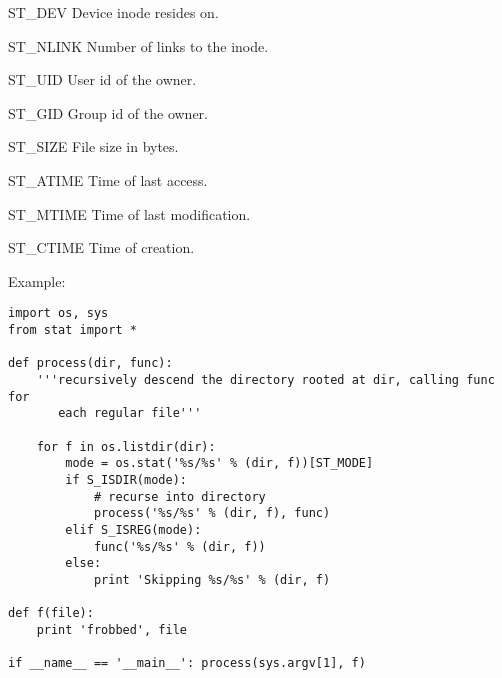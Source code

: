 \begin{datadesc}{ST_DEV}
Device inode resides on.
\end{datadesc}

\begin{datadesc}{ST_NLINK}
Number of links to the inode.
\end{datadesc}

\begin{datadesc}{ST_UID}
User id of the owner.
\end{datadesc}

\begin{datadesc}{ST_GID}
Group id of the owner.
\end{datadesc}

\begin{datadesc}{ST_SIZE}
File size in bytes.
\end{datadesc}

\begin{datadesc}{ST_ATIME}
Time of last access.
\end{datadesc}

\begin{datadesc}{ST_MTIME}
Time of last modification.
\end{datadesc}

\begin{datadesc}{ST_CTIME}
Time of creation.
\end{datadesc}

Example:

\bcode\begin{verbatim}
import os, sys
from stat import *

def process(dir, func):
    '''recursively descend the directory rooted at dir, calling func for
       each regular file'''

    for f in os.listdir(dir):
        mode = os.stat('%s/%s' % (dir, f))[ST_MODE]
        if S_ISDIR(mode):
            # recurse into directory
            process('%s/%s' % (dir, f), func)
        elif S_ISREG(mode):
            func('%s/%s' % (dir, f))
        else:
            print 'Skipping %s/%s' % (dir, f)

def f(file):
    print 'frobbed', file

if __name__ == '__main__': process(sys.argv[1], f)
\end{verbatim}\ecode
